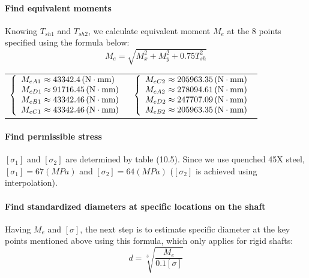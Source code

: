 \paragraph{Find equivalent moments} Knowing $ T_{sh1} $ and $ T_{sh2} $, we calculate equivalent moment $ M_e $ at the 8 points specified using the formula below:
\[M_e = \sqrt{M_x^2 + M_y^2 + 0.75T_{sh}^2}\]

	\begin{tabular}{p{7cm}p{7cm}}
		$
		\left\{ 
		\begin{array}{l@{{} \approx {}}l}
		M_{eA1} & 43342.4\unit{(N\cdot mm)}\\
		M_{eD1} & 91716.45\unit{(N\cdot mm)}\\
		M_{eB1} & 43342.46\unit{(N\cdot mm)}\\
		M_{eC1} & 43342.46\unit{(N\cdot mm)}\\
		\end{array}
		\right.
		$ &
		$
		\left\{ 
		\begin{array}{l@{{} \approx {}}l}
		M_{eC2} & 205963.35\unit{(N\cdot mm)}\\
		M_{eA2} & 278094.61\unit{(N\cdot mm)}\\
		M_{eD2} & 247707.09\unit{(N\cdot mm)}\\
		M_{eB2} & 205963.35\unit{(N\cdot mm)}\\
		\end{array}
		\right.
		$
	\end{tabular}\vskip2mm

\paragraph{Find permissible stress}
$ [\sigma_1] $ and $ [\sigma_2] $ are determined by table (10.5). Since we use quenched 45X steel, $ [\sigma_1] = 67 \unit{(MPa)}$ and $ [\sigma_2] = 64 \unit{(MPa)}$ ($ [\sigma_2] $ is achieved using interpolation).

\paragraph{Find standardized diameters at specific locations on the shaft} Having $ M_e $ and $ [\sigma] $, the next step is to estimate specific diameter at the key points mentioned above using this formula, which only applies for rigid shafts:
\[d = \sqrt[3]{\dfrac{M_e}{0.1[\sigma]}}\]

